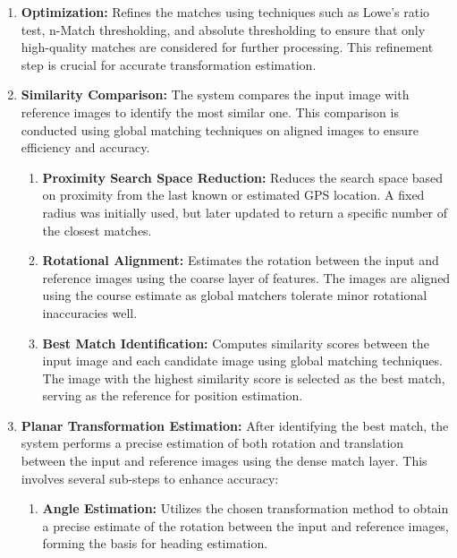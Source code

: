 \begin{enumerate}
\begin{enumerate}
        \item \textbf{Optimization:}  
        Refines the matches using techniques such as Lowe's ratio test, n-Match thresholding, and absolute thresholding to ensure that only high-quality matches are considered for further processing. This refinement step is crucial for accurate transformation estimation. 

    \item \textbf{Similarity Comparison:}  
    The system compares the input image with reference images to identify the most similar one. This comparison is conducted using global matching techniques on aligned images to ensure efficiency and accuracy.
    \begin{enumerate}
        \item \textbf{Proximity Search Space Reduction:}  
        Reduces the search space based on proximity from the last known or estimated GPS location. A fixed radius was initially used, but later updated to return a specific number of the closest matches. 
        
        \item \textbf{Rotational Alignment:}  
        Estimates the rotation between the input and reference images using the coarse layer of features. The images are aligned using the course estimate as global matchers tolerate minor rotational inaccuracies well.
        
        \item \textbf{Best Match Identification:}  
        Computes similarity scores between the input image and each candidate image using global matching techniques. The image with the highest similarity score is selected as the best match, serving as the reference for position estimation.
    \end{enumerate}



    \item \textbf{Planar Transformation Estimation:}  
    After identifying the best match, the system performs a precise estimation of both rotation and translation between the input and reference images using the dense match layer. This involves several sub-steps to enhance accuracy:
    \begin{enumerate}
        \item \textbf{Angle Estimation:}  
        Utilizes the chosen transformation method to obtain a precise estimate of the rotation between the input and reference images, forming the basis for heading estimation.
        

\end{enumerate}
\end{enumerate}
\end{enumerate}
